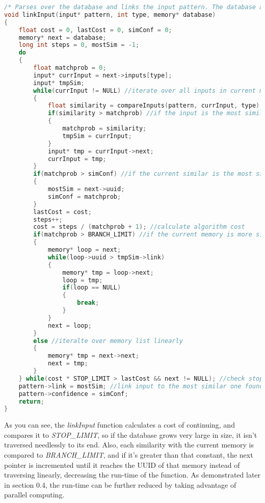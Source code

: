 \documentclass{report}
\begin{document}
\begin{lstlisting}[language=C]
/* Parses over the database and links the input pattern. The database arg is the database to be searched, and the type is the index of the input pattern. */
void linkInput(input* pattern, int type, memory* database)
{
    float cost = 0, lastCost = 0, simConf = 0;
    memory* next = database;
    long int steps = 0, mostSim = -1;
    do
    {
        float matchprob = 0;
        input* currInput = next->inputs[type];
        input* tmpSim;
        while(currInput != NULL) //iterate over all inputs in current memory
        {
            float similarity = compareInputs(pattern, currInput, type); //compare them with the pattern input
            if(similarity > matchprob) //if the input is the most similar of all inputs in the memory so far, save it
            {
                matchprob = similarity;
                tmpSim = currInput;
            }
            input* tmp = currInput->next;
            currInput = tmp;
        }
        if(matchprob > simConf) //if the current similar is the most similar so far, save it
        {
            mostSim = next->uuid;
            simConf = matchprob;
        }
        lastCost = cost;
        steps++;
        cost = steps / (matchprob + 1); //calculate algorithm cost
        if(matchprob > BRANCH_LIMIT) //if the current memory is more similar than the BRANCH_LIMIT, go to the linked memory instead of iterating linearly
        {
            memory* loop = next;
            while(loop->uuid > tmpSim->link)
            {
                memory* tmp = loop->next;
                loop = tmp;
                if(loop == NULL)
                {
                    break;
                }
            }
            next = loop;
        }
        else //iteralte over memory list linearly
        {
            memory* tmp = next->next;
            next = tmp;
        }
    } while(cost * STOP_LIMIT > lastCost && next != NULL); //check stop conditions
    pattern->link = mostSim; //link input to the most similar one found
    pattern->confidence = simConf;
    return;
}
\end{lstlisting}

As you can see, the \textit{linkInput} function calculates a cost of continuing, and compares it to \textit{STOP\_LIMIT}, so if the database grows very large in size, it isn't traversed needlessly to its end. Also, each similarity with the current memory is compared to \textit{BRANCH\_LIMIT}, and if it's greater than that constant, the next pointer is incremented until it reaches the UUID of that memory instead of traversing linearly, decreasing the run-time of the function. As demonstrated later in section 0.4, the run-time can be further reduced by taking advantage of parallel computing. 
\end{document}
